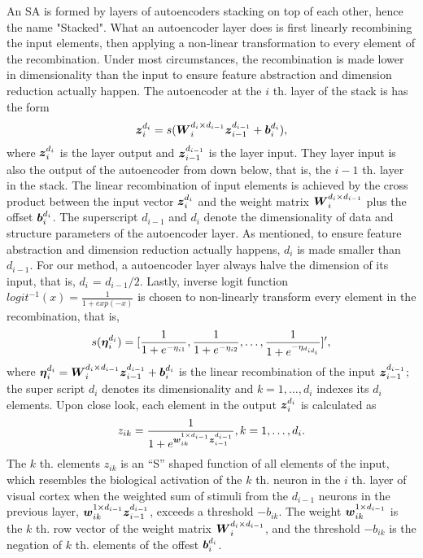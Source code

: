 {An SA is formed by layers of autoencoders stacking on top of each other, hence the name "Stacked". What an autoencoder layer does is first linearly recombining the input elements, then applying a non-linear transformation to every element of the recombination. Under most circumstances, the recombination is made lower in dimensionality than the input to ensure feature abstraction and dimension reduction actually happen. The autoencoder at the $i$ th. layer of the stack is has the form
\begin{equation} \label{eq:AE}
  \boldsymbol{z}_i^{d_i} = s(\boldsymbol{W}_{i}^{d_{i} \times d_{i-1}} {\boldsymbol{z}_{i-1}^{d_{i-1}}} + \boldsymbol{b}_{i}^{d_{i}}),
\end{equation}
where ${\boldsymbol{z}_{i}^{d_{i}}}$ is the layer output and ${\boldsymbol{z}_{i-1}^{d_{i-1}}}$ is the layer input. They layer input is also the output of the autoencoder from down below, that is, the $i-1$ th. layer in the stack. The linear recombination of input elements is achieved by the cross product between the input vector ${\boldsymbol{z}_{i}^{d_{i}}}$ and the weight matrix $\boldsymbol{W}_{i}^{d_{i} \times d_{i-1}}$ plus the offset $\boldsymbol{b}_{i}^{d_{i}}$. The superscript $d_{i-1}$ and $d_i$ denote the dimensionality of data and structure parameters of the autoencoder layer. As mentioned, to ensure feature abstraction and dimension reduction actually happens, $d_i$ is made smaller than $d_{i-1}$. For our method, a autoencoder layer always halve the dimension of its input, that is, $d_i$ = $d_{i-1}/2$. Lastly, inverse logit function $logit^{-1}(x) = \frac{1}{1+exp(-x)}$ is chosen to non-linearly transform every element in the recombination, that is,
\begin{equation} \label{eq:InvLgt}
    s(\boldsymbol{\eta}_i^{d_i})     = [\frac{1}{1+e^{-\eta_{i1}}}, \frac{1}{1+e^{-\eta_{i2}}}, \dots, \frac{1}{1+e^{-\eta_{d_{id_i}}}}]^{\prime},
\end{equation}
where $\boldsymbol{\eta}_i^{d_i} = \boldsymbol{W}_{i}^{d_{i} \times d_{i-1}} {\boldsymbol{z}_{i-1}^{d_{i-1}}} + \boldsymbol{b}_{i}^{d_{i}}$ is the linear recombination of the input ${\boldsymbol{z}_{i-1}^{d_{i-1}}}$; the super script $d_i$ denotes its dimensionality and $k = 1, \dots, d_i$ indexes its $d_i$ elements. Upon close look, each element in the output ${\boldsymbol{z}_{i}^{d_{i}}}$ is calculated as
\[ z_{ik} = \frac{1}{1 + e^{{\boldsymbol{w}_{ik}^{1 \times d_{i-1}}} {\boldsymbol{z}_{i-1}^{d_{i-1}}}}}, k = 1, \dots, d_i .\]
The $k$ th. elements $z_{ik}$ is an ``S'' shaped function of all elements of the input, which resembles the biological activation of the $k$ th. neuron in the $i$ th. layer of visual cortex when the weighted sum of stimuli from the $d_{i-1}$ neurons in the previous layer, ${\boldsymbol{w}_{ik}^{1 \times d_{i-1}}} {\boldsymbol{z}_{i-1}^{d_{i-1}}}$, exceeds a threshold $-b_{ik}$. The weight ${\boldsymbol{w}_{ik}^{1 \times d_{i-1}}}$ is the $k$ th. row vector of the weight matrix $\boldsymbol{W}_{i}^{d_{i} \times d_{i-1}}$, and the threshold $-b_{ik}$ is the negation of $k$ th. elements of the offest $\boldsymbol{b}_{i}^{d_{i}}$.

}
